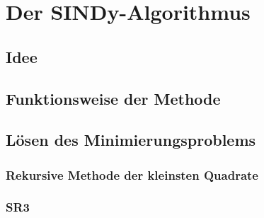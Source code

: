 \documentclass[arbeit=studie,oneside,BCOR=12mm]{ArbeitRST}
\begin{document}
%



\chapter{Der SINDy-Algorithmus}
\section{Idee} 

\section{Funktionsweise der Methode}

\section{Lösen des Minimierungsproblems}

\subsection{Rekursive Methode der kleinsten Quadrate}

\subsection{SR3}
%
\end{document}
